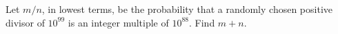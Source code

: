 Let $m/n$, in lowest terms, be the probability that a randomly chosen positive divisor of $10^{99}$ is an integer multiple of $10^{88}$.  Find $m + n$.